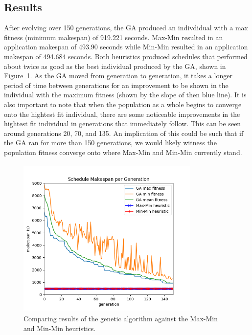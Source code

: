 \subsection*{Results}
After evolving over 150 generations, the GA produced an indivdidual with a
max fitness (minimum makespan) of 919.221 seconds. Max-Min resulted in an
application makespan of 493.90 seconds while Min-Min resulted in an application
makespan of 494.684 seconds. Both heuristics produced schedules that performed
about twice as good as the best individual produced by the GA, shown in
Figure~\ref{fig:results}. As the GA moved from generation to generation, it
takes a longer period of time between generations for an improvement to be
shown in the individual with the maximum fitness (shown by the slope of then blue line). It is also important to note
that when the population as a whole begins to converge onto the hightest fit
individual, there are some noticeable improvements in the hightest fit
individual in generations that immediately follow. This can be seen around generations 20, 70, and 135. An implication
of this could be such that if the GA ran for more than 150 generations, we
would likely witness the population fitness converge onto where Max-Min and Min-Min
currently stand.
\begin{figure}[t!]
  \centering
  \includegraphics[width=90mm, height=80mm]{figures/results.png}
  \caption{Comparing results of the genetic algorithm against the Max-Min and Min-Min heuristics.}
  \label{fig:results}
\end{figure}
